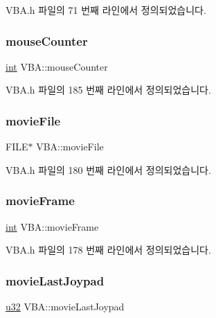 V\+B\+A.\+h 파일의 71 번째 라인에서 정의되었습니다.

\mbox{\label{class_v_b_a_af042fea29b45069293e90bef70c7839a}} 
\subsubsection{\texorpdfstring{mouse\+Counter}{mouseCounter}}
{\footnotesize\ttfamily \mbox{\hyperlink{_util_8cpp_a0ef32aa8672df19503a49fab2d0c8071}{int}} V\+B\+A\+::mouse\+Counter}



V\+B\+A.\+h 파일의 185 번째 라인에서 정의되었습니다.

\mbox{\label{class_v_b_a_abf9ac3c15536552d322f20a2dad1f519}} 
\subsubsection{\texorpdfstring{movie\+File}{movieFile}}
{\footnotesize\ttfamily F\+I\+LE$\ast$ V\+B\+A\+::movie\+File}



V\+B\+A.\+h 파일의 180 번째 라인에서 정의되었습니다.

\mbox{\label{class_v_b_a_ae1d2d002a3d425b509b93171e8ade926}} 
\subsubsection{\texorpdfstring{movie\+Frame}{movieFrame}}
{\footnotesize\ttfamily \mbox{\hyperlink{_util_8cpp_a0ef32aa8672df19503a49fab2d0c8071}{int}} V\+B\+A\+::movie\+Frame}



V\+B\+A.\+h 파일의 178 번째 라인에서 정의되었습니다.

\mbox{\label{class_v_b_a_a911d9dbab0a3565480a29b8149099ed1}} 
\subsubsection{\texorpdfstring{movie\+Last\+Joypad}{movieLastJoypad}}
{\footnotesize\ttfamily \mbox{\hyperlink{_system_8h_a10e94b422ef0c20dcdec20d31a1f5049}{u32}} V\+B\+A\+::movie\+Last\+Joypad}



